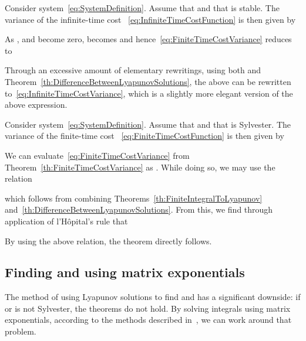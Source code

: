 \documentclass[twocolumn]{autart}
\begin{document}
\begin{thm}\label{th:InfiniteTimeCostVariance}
Consider system~\eqref{eq:SystemDefinition}. Assume that  and that  is stable. The variance  of the infinite-time cost ~\eqref{eq:InfiniteTimeCostFunction} is then given by

\end{thm}
\begin{pf}
As ,  and  become zero,  becomes  and hence~\eqref{eq:FiniteTimeCostVariance} reduces to

Through an excessive amount of elementary rewritings, using both  and Theorem~\ref{th:DifferenceBetweenLyapunovSolutions}, the above can be rewritten to~\eqref{eq:InfiniteTimeCostVariance}, which is a slightly more elegant version of the above expression.
\end{pf}

\begin{thm}\label{th:FiniteTimeCostVarianceWithAlphaZero}
Consider system~\eqref{eq:SystemDefinition}. Assume that  and that  is Sylvester. The variance  of the finite-time cost ~\eqref{eq:FiniteTimeCostFunction} is then given by

\end{thm}
\begin{pf}
We can evaluate~\eqref{eq:FiniteTimeCostVariance} from Theorem~\ref{th:FiniteTimeCostVariance} as . While doing so, we may use the relation

which follows from combining Theorems~\ref{th:FiniteIntegralToLyapunov} and~\ref{th:DifferenceBetweenLyapunovSolutions}. From this, we find through application of l'H\^opital's rule that

By using the above relation, the theorem directly follows.
\end{pf}

\subsection{Finding  and  using matrix exponentials}

The method of using Lyapunov solutions to find  and  has a significant downside: if  or  is not Sylvester, the theorems do not hold. By solving integrals using matrix exponentials, according to the methods described in~\cite{MatrixExponentials}, we can work around that problem.
\end{document}
